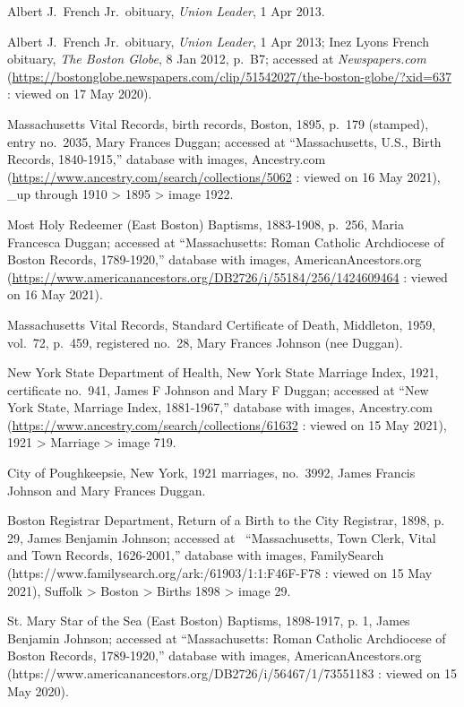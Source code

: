 \begin{thebibliography}{999}
Albert J.\ French Jr.\ obituary, \textit{Union Leader}, 1 Apr 2013.

Albert J.\ French Jr.\ obituary, \textit{Union Leader}, 1 Apr 2013; Inez Lyons French obituary, \textit{The Boston Globe}, 8 Jan 2012, p.\ B7; accessed at \textit{Newspapers.com} (\url{https://bostonglobe.newspapers.com/clip/51542027/the-boston-globe/?xid=637} : viewed on 17 May 2020).


Massachusetts Vital Records, birth records, Boston, 1895, p.\ 179 (stamped), entry no.\ 2035, Mary Frances Duggan; accessed at ``Massachusetts, U.S., Birth Records, 1840-1915,'' database with images, Ancestry.com (\url{https://www.ancestry.com/search/collections/5062} : viewed on 16 May 2021), \_up through 1910 > 1895 > image 1922.

Most Holy Redeemer (East Boston) Baptisms, 1883-1908, p.\ 256, Maria Francesca Duggan; accessed at ``Massachusetts: Roman Catholic Archdiocese of Boston Records, 1789-1920,'' database with images, AmericanAncestors.org (\url{https://www.americanancestors.org/DB2726/i/55184/256/1424609464} : viewed on 16 May 2021).

Massachusetts Vital Records, Standard Certificate of Death, Middleton, 1959, vol.\ 72, p.\ 459, registered no.\ 28, Mary Frances Johnson (nee Duggan).

New York State Department of Health, New York State Marriage Index, 1921, certificate no.\ 941, James F Johnson and Mary F Duggan; accessed at ``New York State, Marriage Index, 1881-1967,'' database with images, Ancestry.com (\url{https://www.ancestry.com/search/collections/61632} : viewed on 15 May 2021), 1921 > Marriage > image 719.

City of Poughkeepsie, New York, 1921 marriages, no.\ 3992, James Francis Johnson and Mary Frances Duggan.

Boston Registrar Department, Return of a Birth to the City Registrar, 1898, p. 29, James Benjamin Johnson; accessed at  ``Massachusetts, Town Clerk, Vital and Town Records, 1626-2001,'' database with images, FamilySearch (https://www.familysearch.org/ark:/61903/1:1:F46F-F78 : viewed on 15 May 2021), Suffolk > Boston > Births 1898 > image 29.

St. Mary Star of the Sea (East Boston) Baptisms, 1898-1917, p. 1, James Benjamin Johnson; accessed at ``Massachusetts: Roman Catholic Archdiocese of Boston Records, 1789-1920,'' database with images, AmericanAncestors.org (https://www.americanancestors.org/DB2726/i/56467/1/73551183 : viewed on 15 May 2020).


\end{thebibliography}
